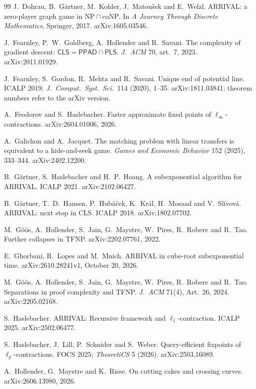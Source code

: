 \begin{thebibliography}{99}
 J.~Dohrau, B.~G\"artner, M.~Kohler, J.~Matou\v{s}ek and E.~Welzl. ARRIVAL: a
zero-player graph game in $\mathrm{NP}\cap\mathrm{coNP}$. In \emph{A Journey Through Discrete
Mathematics}, Springer, 2017. arXiv:1605.03546.

 J.~Fearnley, P.~W.~Goldberg, A.~Hollender and R.~Savani. The complexity of gradient
descent: $\mathsf{CLS}=\mathsf{PPAD}\cap\mathsf{PLS}$. \emph{J.~ACM} 70, art.~7, 2023. arXiv:2011.01929.

 J.~Fearnley, S.~Gordon, R.~Mehta and R.~Savani. Unique end of potential line. ICALP 2019; \emph{J.~Comput.\ Syst.\ Sci.}\ 114 (2020), 1--35. arXiv:1811.03841; theorem numbers refer to the arXiv version.

 A.~Feodorov and S.~Haslebacher. Faster approximate fixed points of $\ell_\infty$-contractions. arXiv:2604.01006, 2026.

 A.~Galichon and A.~Jacquet. The matching problem with linear transfers is
equivalent to a hide-and-seek game. \emph{Games and Economic Behavior} 152 (2025), 333--344.
arXiv:2402.12200.

 B.~G\"artner, S.~Haslebacher and H.~P.~Hoang. A subexponential algorithm for ARRIVAL. ICALP 2021. arXiv:2102.06427.

 B.~G\"artner, T.~D.~Hansen, P.~Hub\'a\v{c}ek, K.~Kr\'al, H.~Mosaad and
V.~Sl\'ivov\'a. ARRIVAL: next stop in CLS. ICALP 2018. arXiv:1802.07702.

 M.~G\"o\"os, A.~Hollender, S.~Jain, G.~Maystre, W.~Pires, R.~Robere and R.~Tao. Further collapses in TFNP. arXiv:2202.07761, 2022.

 E.~Ghorbani, R.~Lopes and M.~Mnich. ARRIVAL in cube-root subexponential time.
arXiv:2610.28241v1, October 20, 2026.

 M.~G\"o\"os, A.~Hollender, S.~Jain, G.~Maystre, W.~Pires, R.~Robere and R.~Tao. Separations in proof complexity and TFNP. \emph{J.~ACM} 71(4), Art.~26, 2024. arXiv:2205.02168.

 S.~Haslebacher. ARRIVAL: Recursive framework and $\ell_1$-contraction. ICALP 2025. arXiv:2502.06477.

 S.~Haslebacher, J.~Lill, P.~Schnider and S.~Weber. Query-efficient fixpoints of $\ell_p$-contractions. FOCS 2025; \emph{TheoretiCS} 5 (2026). arXiv:2503.16089.

 A.~Hollender, G.~Maystre and K.~Risse. On cutting cakes and crossing curves.
arXiv:2606.13980, 2026.


\end{thebibliography}
